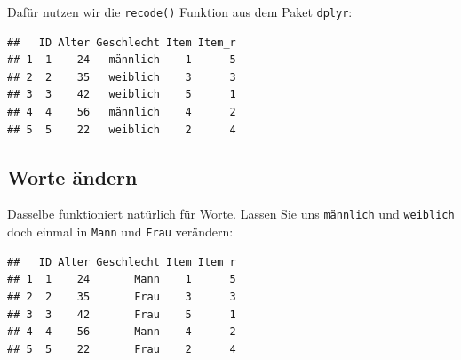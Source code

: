\documentclass[
]{book}
\newenvironment{Shaded}{\begin{snugshade}}{\end{snugshade}}
\newcommand{\DecValTok}[1]{\textcolor[rgb]{0.00,0.00,0.81}{#1}}
\newcommand{\FunctionTok}[1]{\textcolor[rgb]{0.00,0.00,0.00}{#1}}
\newcommand{\NormalTok}[1]{#1}
\newcommand{\OtherTok}[1]{\textcolor[rgb]{0.56,0.35,0.01}{#1}}
\newcommand{\SpecialCharTok}[1]{\textcolor[rgb]{0.00,0.00,0.00}{#1}}
\newcommand{\StringTok}[1]{\textcolor[rgb]{0.31,0.60,0.02}{#1}}
\begin{document}
Dafür nutzen wir die \texttt{recode()} Funktion aus dem Paket \texttt{dplyr}:

\begin{Shaded}
\end{Shaded}

\begin{verbatim}
##   ID Alter Geschlecht Item Item_r
## 1  1    24   männlich    1      5
## 2  2    35   weiblich    3      3
## 3  3    42   weiblich    5      1
## 4  4    56   männlich    4      2
## 5  5    22   weiblich    2      4
\end{verbatim}

\hypertarget{worte-uxe4ndern}{%
\subsection{Worte ändern}\label{worte-uxe4ndern}}

Dasselbe funktioniert natürlich für Worte. Lassen Sie uns \texttt{männlich} und \texttt{weiblich} doch einmal in \texttt{Mann} und \texttt{Frau} verändern:

\begin{Shaded}
\end{Shaded}

\begin{verbatim}
##   ID Alter Geschlecht Item Item_r
## 1  1    24       Mann    1      5
## 2  2    35       Frau    3      3
## 3  3    42       Frau    5      1
## 4  4    56       Mann    4      2
## 5  5    22       Frau    2      4
\end{verbatim}
\end{document}
